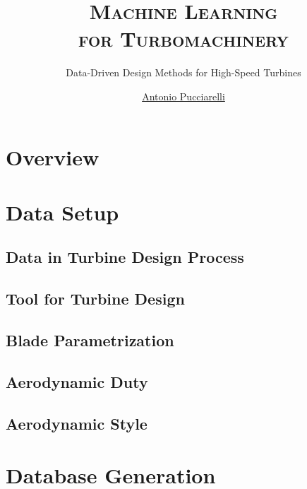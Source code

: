 \documentclass[UKenglish, aspectratio = 169]{beamer}
\date{\displaydate{date}}
\author[Antonio Pucciarelli]{\href{https://github.com/antoniopucciarelli}{Antonio Pucciarelli}}
\title{\textsc{Machine Learning \\ for Turbomachinery}}
\subtitle{Data-Driven Design Methods for High-Speed Turbines}
\begin{document}
\hidelogo

\section{Overview}
\SectionPage





\section{Data Setup}
\SectionPage



\subsection{Data in Turbine Design Process}
\SubSectionPage



\subsection{Tool for Turbine Design}
\SubSectionPage



\subsection{Blade Parametrization}
\SubSectionPage



\subsection{Aerodynamic Duty}
\SubSectionPage



\subsection{Aerodynamic Style}
\SubSectionPage



\section{Database Generation}
\SectionPage
\end{document}
